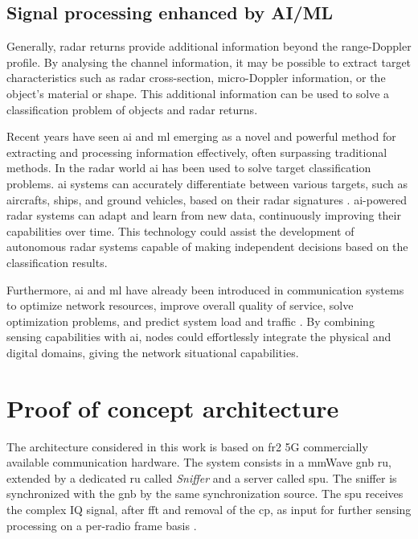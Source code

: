 	\subsection{Signal processing enhanced by AI/ML}
	Generally, radar returns provide additional information beyond the range-Doppler profile. 
	By analysing the channel information, it may be possible to extract target characteristics such as radar cross-section, micro-Doppler information, or the object's material or shape.
	This additional information can be used to solve a classification problem of objects and radar returns.
	
	Recent years have seen \gls{ai} and \gls{ml} emerging as a novel and powerful method for extracting and processing information effectively, often surpassing traditional methods.
	In the radar world \gls{ai} has been used to solve target classification problems. 
	\Gls{ai} systems can accurately differentiate between various targets, such as aircrafts, ships, and ground vehicles, based on their radar signatures \cite{survey_radar_AIML}. 
	\gls{ai}-powered radar systems can adapt and learn from new data, continuously improving their capabilities over time. 
	This technology could assist the development of autonomous radar systems capable of making independent decisions based on the classification results. 
	
	 Furthermore, \gls{ai} and \gls{ml} have already been introduced in communication systems to optimize network resources, improve overall quality of service, solve optimization problems, and predict system load and traffic \cite{30_years_ai_survey}. 
	 By combining sensing capabilities with \gls{ai}, nodes could effortlessly integrate the physical and digital domains, giving the network situational capabilities.
	


\section{Proof of concept architecture}
	\label{sec:intro-PoCarchitecture}
	
	The architecture considered in this work is based on \gls{fr2} 5G commercially available communication hardware.
	The system consists in a mmWave \gls{gnb} \gls{ru}, extended by a dedicated \gls{ru} called \textit{Sniffer} and a server called \gls{spu}. 
	The sniffer is synchronized with the \gls{gnb} by the same synchronization source. 
	The \gls{spu} receives the complex IQ signal,  after \gls{fft} and removal of the \gls{cp}, as input for further sensing processing on a per-radio frame basis \cite{Wild_Grudnitsky_Mandelli_Henninger_Guan_Schaich_2023}.
	
